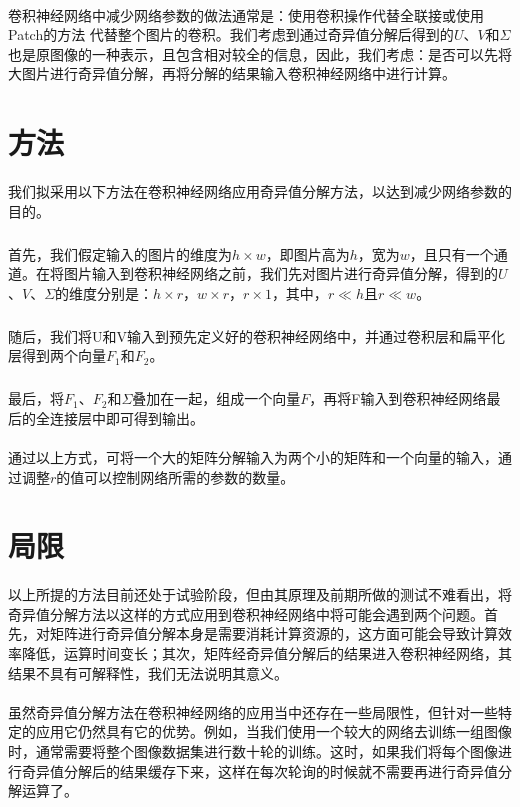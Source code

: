 \documentclass[12pt,a4paper]{article}
\begin{document}
\paragraph{} 卷积神经网络中减少网络参数的做法通常是：使用卷积操作代替全联接或使用Patch的方法\cite{pix2pix} 代替整个图片的卷积。我们考虑到通过奇异值分解后得到的$U$、$V$和$\Sigma$也是原图像的一种表示，且包含相对较全的信息，因此，我们考虑：是否可以先将大图片进行奇异值分解，再将分解的结果输入卷积神经网络中进行计算。

\section{方法}
\paragraph{} 我们拟采用以下方法在卷积神经网络应用奇异值分解方法，以达到减少网络参数的目的。
	\subparagraph{} 首先，我们假定输入的图片的维度为$h\times w$，即图片高为$h$，宽为$w$，且只有一个通道。在将图片输入到卷积神经网络之前，我们先对图片进行奇异值分解，得到的$U$、$V$、$\Sigma$的维度分别是：$h\times r$，$w \times r$，$r\times 1$，其中，$r \ll h$且$r \ll w$。
	\subparagraph{} 随后，我们将U和V输入到预先定义好的卷积神经网络中，并通过卷积层和扁平化层得到两个向量$F_1$和$F_2$。
	\subparagraph{} 最后，将$F_1$、$F_2$和$\Sigma$叠加在一起，组成一个向量$F$，再将F输入到卷积神经网络最后的全连接层中即可得到输出。
\paragraph{} 通过以上方式，可将一个大的矩阵分解输入为两个小的矩阵和一个向量的输入，通过调整$r$的值可以控制网络所需的参数的数量。

\section{局限}
\paragraph{} 以上所提的方法目前还处于试验阶段，但由其原理及前期所做的测试不难看出，将奇异值分解方法以这样的方式应用到卷积神经网络中将可能会遇到两个问题。首先，对矩阵进行奇异值分解本身是需要消耗计算资源的，这方面可能会导致计算效率降低，运算时间变长；其次，矩阵经奇异值分解后的结果进入卷积神经网络，其结果不具有可解释性，我们无法说明其意义。
\paragraph{} 虽然奇异值分解方法在卷积神经网络的应用当中还存在一些局限性，但针对一些特定的应用它仍然具有它的优势。例如，当我们使用一个较大的网络去训练一组图像时，通常需要将整个图像数据集进行数十轮的训练。这时，如果我们将每个图像进行奇异值分解后的结果缓存下来，这样在每次轮询的时候就不需要再进行奇异值分解运算了。







\end{document}
